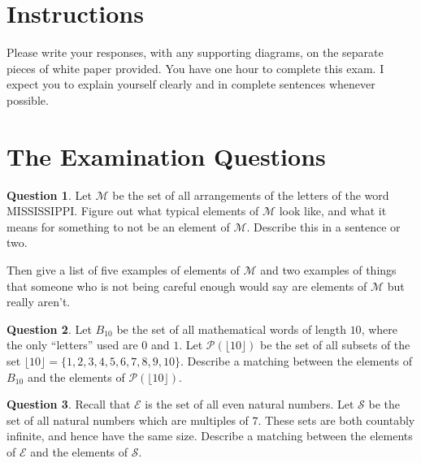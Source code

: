 \documentclass[12pt,letterpaper]{article}
\theoremstyle{definition}
\newtheorem{question}{Question}
\begin{document}
\setlength{\parskip}{1ex plus 0.5ex minus 0.2ex}
\setlength{\parindent}{0pt}

\pagestyle{fancy}
\cfoot{}

\section*{Instructions}
Please write your responses, with any supporting diagrams, on the separate pieces of white paper provided.  You have one hour to complete this exam. I expect you to explain yourself clearly and in complete sentences whenever possible.

\section*{The Examination Questions}

\begin{question}
Let $\mathcal{M}$ be the set of all arrangements of the letters of the word MISSISSIPPI.
Figure out what typical elements of $\mathcal{M}$ look like, and what it means for something to not be an element of $\mathcal{M}$.
Describe this in a sentence or two.

Then give a list of five examples of elements of $\mathcal{M}$ and two examples of things that someone who is not being careful enough would say are elements of $\mathcal{M}$ but really aren’t.
\end{question}

\vspace{.5in}

\begin{question}
Let $B_{10}$ be the set of all mathematical words of length $10$, where the only ``letters'' used are $0$ and $1$.
Let $\mathcal{P}(\lfloor 10 \rfloor)$ be the set of all subsets of the set $\lfloor 10 \rfloor = \{ 1, 2, 3, 4, 5, 6, 7, 8, 9, 10 \}$.
Describe a matching between the elements of $B_{10}$ and the elements of $\mathcal{P}(\lfloor 10 \rfloor)$.
\end{question}

\vspace{.5in}

\begin{question}
Recall that $\mathcal{E}$ is the set of all even natural numbers.
Let $\mathcal{S}$ be the set of all natural numbers which are multiples of $7$.
These sets are both countably infinite, and hence have the same size.
Describe a matching between the elements of $\mathcal{E}$ and the elements of $\mathcal{S}$.
\end{question}
\end{document}
